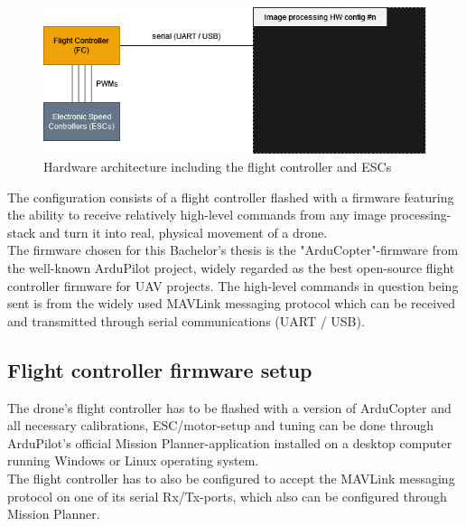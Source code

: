 \begin{figure}[h]
    \centering
    \includegraphics[width=\textwidth]{fig/arch_fc.png}
    \caption{Hardware architecture including the flight controller and ESCs}
    \label{fig:hw_fc}
\end{figure}

The configuration consists of a flight controller flashed with a firmware featuring the ability to receive relatively high-level commands from any image processing-stack and turn it into real, physical movement of a drone.\\
The firmware chosen for this Bachelor's thesis is the "ArduCopter"-firmware from the well-known ArduPilot\cite{documentation-ArduPilot} project, widely regarded as the best open-source flight controller firmware for UAV projects.\cite{firmware-FC} The high-level commands in question being sent is from the widely used MAVLink\cite{documentation-MAVLink} messaging protocol which can be received and transmitted through serial communications (UART / USB).

\subsection{Flight controller firmware setup}
The drone's flight controller has to be flashed with a version of ArduCopter and all necessary calibrations, ESC/motor-setup and tuning can be done through ArduPilot's official Mission Planner-application\cite{documentation-ArduPilot} installed on a desktop computer running Windows or Linux operating system.\\
The flight controller has to also be configured to accept the MAVLink messaging protocol on one of its serial Rx/Tx-ports, which also can be configured through Mission Planner.

\newpage


